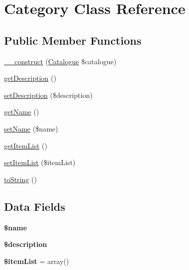 \hypertarget{class_category}{\section{Category Class Reference}
\label{class_category}
}
\subsection*{Public Member Functions}
\begin{DoxyCompactItemize}
\item 
\hyperlink{class_category_a6329446f0c6071df0a3d1b2d02dfbe5c}{\+\_\+\+\_\+construct} (\hyperlink{class_catalogue}{Catalogue} \$catalogue)
\item 
\hyperlink{class_category_a2e7bb35c71bf1824456ceb944cb7a845}{get\+Description} ()
\item 
\hyperlink{class_category_a31fad3e39336ea079ea758e051866627}{set\+Description} (\$description)
\item 
\hyperlink{class_category_a3d0963e68bb313b163a73f2803c64600}{get\+Name} ()
\item 
\hyperlink{class_category_a2fe666694997d047711d7653eca2f132}{set\+Name} (\$name)
\item 
\hyperlink{class_category_a72c1264f490b6d6e5e7ba32d10fb782d}{get\+Item\+List} ()
\item 
\hyperlink{class_category_a6fc63808e879d9282b89cc0ec214aba9}{set\+Item\+List} (\$item\+List)
\item 
\hyperlink{class_category_a5558c5d549f41597377fa1ea8a1cefa3}{to\+String} ()
\end{DoxyCompactItemize}
\subsection*{Data Fields}
\begin{DoxyCompactItemize}
\item 
\hypertarget{class_category_ab2fc40d43824ea3e1ce5d86dee0d763b}{{\bfseries \$name}}\label{class_category_ab2fc40d43824ea3e1ce5d86dee0d763b}

\item 
\hypertarget{class_category_a87b032cba06009e3467abf1c8018d960}{{\bfseries \$description}}\label{class_category_a87b032cba06009e3467abf1c8018d960}

\item 
\hypertarget{class_category_abe7a4a4a0aa58c2491c4e0cde4508487}{{\bfseries \$item\+List} = array()}\label{class_category_abe7a4a4a0aa58c2491c4e0cde4508487}

\end{DoxyCompactItemize}


